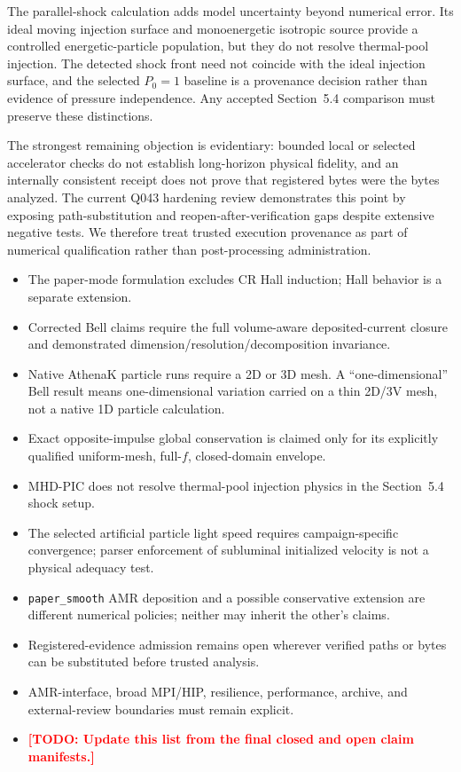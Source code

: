 \documentclass[twocolumn]{aastex701}
\newcommand{\TODO}[1]{\textcolor{red}{\textbf{[TODO: #1]}}}
\begin{document}
The parallel-shock calculation adds model uncertainty beyond numerical error.
Its ideal moving injection surface and monoenergetic isotropic source provide a
controlled energetic-particle population, but they do not resolve thermal-pool
injection. The detected shock front need not coincide with the ideal injection
surface, and the selected $P_0=1$ baseline is a provenance decision rather
than evidence of pressure independence. Any accepted Section~5.4 comparison
must preserve these distinctions.

The strongest remaining objection is evidentiary: bounded local or selected
accelerator checks do not establish long-horizon physical fidelity, and an
internally consistent receipt does not prove that registered bytes were the
bytes analyzed. The current Q043 hardening review demonstrates this point by
exposing path-substitution and reopen-after-verification gaps despite extensive
negative tests. We therefore treat trusted execution provenance as part of
numerical qualification rather than post-processing administration.

\begin{itemize}
\item The paper-mode formulation excludes CR Hall induction; Hall behavior is a
separate extension.
\item Corrected Bell claims require the full volume-aware deposited-current
closure and demonstrated dimension/resolution/decomposition invariance.
\item Native AthenaK particle runs require a 2D or 3D mesh. A
``one-dimensional'' Bell result means one-dimensional variation carried on a
thin 2D/3V mesh, not a native 1D particle calculation.
\item Exact opposite-impulse global conservation is claimed only for its
explicitly qualified uniform-mesh, full-$f$, closed-domain envelope.
\item MHD-PIC does not resolve thermal-pool injection physics in the Section~5.4
shock setup.
\item The selected artificial particle light speed requires campaign-specific
convergence; parser enforcement of subluminal initialized velocity is not a
physical adequacy test.
\item \texttt{paper\_smooth} AMR deposition and a possible conservative
extension are different numerical policies; neither may inherit the other's
claims.
\item Registered-evidence admission remains open wherever verified paths or
bytes can be substituted before trusted analysis.
\item AMR-interface, broad MPI/HIP, resilience, performance, archive, and
external-review boundaries must remain explicit.
\item \TODO{Update this list from the final closed and open claim manifests.}
\end{itemize}
\end{document}
